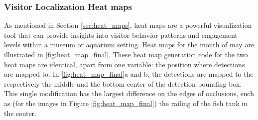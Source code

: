 \subsubsection{Visitor Localization Heat maps}
\label{sec:results_heat maps}
As mentioned in Section \ref{sec:heat_maps}, heat maps are a powerful visualization tool that can provide insights into visitor behavior patterns and engagement levels within a museum or aquarium setting. Heat maps for the month of may are illustrated in \ref{fig:heat_map_final}. These heat map generation code for the two heat maps are identical, apart from one variable: the position where detections are mapped to. In \ref{fig:heat_map_final}a and b, the detections are mapped to the respectively the middle and the bottom center of the detection bounding box. This single modification has the largest difference on the edges of occlusions, such as (for the images in Figure \ref{fig:heat_map_final}) the railing of the fish tank in the center.

